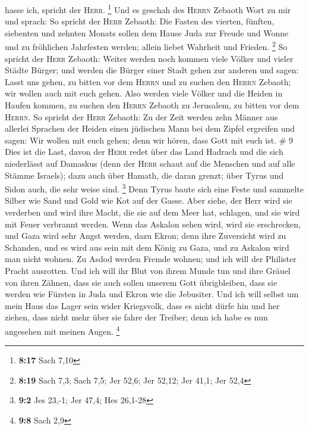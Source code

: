 hasse ich, spricht der \textsc{Herr}. \footnote{\textbf{8:17} Sach 7,10}
 Und es geschah des \textsc{Herrn} Zebaoth Wort zu mir
und sprach:  So spricht der \textsc{Herr} Zebaoth: Die
Fasten des vierten, fünften, siebenten und zehnten Monats sollen dem
Hause Juda zur Freude und Wonne und zu fröhlichen Jahrfesten werden;
allein liebet Wahrheit und Frieden. \footnote{\textbf{8:19} Sach 7,3;
  Sach 7,5; Jer 52,6; Jer 52,12; Jer 41,1; Jer 52,4}  So
spricht der \textsc{Herr} Zebaoth: Weiter werden noch kommen viele
Völker und vieler Städte Bürger;  und werden die Bürger
einer Stadt gehen zur anderen und sagen: Lasst uns gehen, zu bitten vor
dem \textsc{Herrn} und zu suchen den \textsc{Herrn} Zebaoth; wir wollen
auch mit euch gehen.  Also werden viele Völker und die
Heiden in Haufen kommen, zu suchen den \textsc{Herrn} Zebaoth zu
Jerusalem, zu bitten vor dem \textsc{Herrn}.  So spricht
der \textsc{Herr} Zebaoth: Zu der Zeit werden zehn Männer aus allerlei
Sprachen der Heiden einen jüdischen Mann bei dem Zipfel ergreifen und
sagen: Wir wollen mit euch gehen; denn wir hören, dass Gott mit euch
ist. \# 9  Dies ist die Last, davon der \textsc{Herr}
redet über das Land Hadrach und die sich niederlässt auf Damaskus (denn
der \textsc{Herr} schaut auf die Menschen und auf alle Stämme Israels);
 dazu auch über Hamath, die daran grenzt; über Tyrus und
Sidon auch, die sehr weise sind. \footnote{\textbf{9:2} Jes 23,-1; Jer
  47,4; Hes 26,1-28}  Denn Tyrus baute sich eine Feste und
sammelte Silber wie Sand und Gold wie Kot auf der Gasse. 
Aber siehe, der Herr wird sie verderben und wird ihre Macht, die sie auf
dem Meer hat, schlagen, und sie wird mit Feuer verbrannt werden.
 Wenn das Askalon sehen wird, wird sie erschrecken, und
Gaza wird sehr Angst werden, dazu Ekron; denn ihre Zuversicht wird zu
Schanden, und es wird aus sein mit dem König zu Gaza, und zu Askalon
wird man nicht wohnen.  Zu Asdod werden Fremde wohnen; und
ich will der Philister Pracht ausrotten.  Und ich will ihr
Blut von ihrem Munde tun und ihre Gräuel von ihren Zähnen, dass sie auch
sollen unserem Gott übrigbleiben, dass sie werden wie Fürsten in Juda
und Ekron wie die Jebusiter.  Und ich will selbst um mein
Haus das Lager sein wider Kriegsvolk, dass es nicht dürfe hin und her
ziehen, dass nicht mehr über sie fahre der Treiber; denn ich habe es nun
angesehen mit meinen Augen. \footnote{\textbf{9:8} Sach 2,9}
